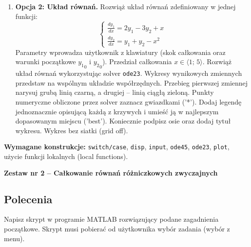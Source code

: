 \documentclass[a4paper,11pt]{article}
\begin{document}
\begin{enumerate}[leftmargin=*, label=\textbf{\arabic*.}, itemsep=2pt]
  \item \textbf{Opcja 2: Układ równań.}
    Rozwiąż układ równań zdefiniowany w jednej funkcji:\\[-0.5em]
    \[
    \begin{cases}
      \frac{dy_1}{dx} = 2y_1 - 3y_2 + x \\
      \frac{dy_2}{dx} = y_1 + y_2 - x^2
    \end{cases}
    \]
    Parametry wprowadza użytkownik z klawiatury (skok całkowania oraz warunki początkowe $ {y_1}_{0} $ i $ {y_2}_{0} $). Przedział całkowania $x \in \langle 1;\,5 \rangle$.
    Rozwiąż układ równań wykorzystując solver \texttt{ode23}. Wykresy wynikowych zmiennych przedstaw na wspólnym układzie współrzędnych. Przebieg pierwszej zmiennej narysuj grubą linią czarną, a drugiej -- linią ciągłą zieloną. Punkty numeryczne obliczone przez solver zaznacz gwiazdkami ('*'). Dodaj legendę jednoznacznie opisującą każdą z krzywych i umieść ją w najlepszym dopasowanym miejscu ('best'). Koniecznie podpisz osie oraz dodaj tytuł wykresu. Wykres bez siatki (grid off).

\end{enumerate}

\vspace{0.3cm}
\begin{ramka}
\textbf{Wymagane konstrukcje:}
\texttt{switch/case}, \texttt{disp}, \texttt{input}, \texttt{ode45}, \texttt{ode23}, \texttt{plot}, użycie funkcji lokalnych (local functions).
\end{ramka}

\clearpage
\begin{center}
  {\large\bfseries Zestaw nr 2 \quad -- \quad Całkowanie równań różniczkowych zwyczajnych}
\end{center}
\hrulefill
\vspace{0.4cm}

\subsection*{Polecenia}

Napisz skrypt w programie MATLAB rozwiązujący podane zagadnienia początkowe. Skrypt musi pobierać od użytkownika wybór zadania (wybór z menu).
\end{document}
